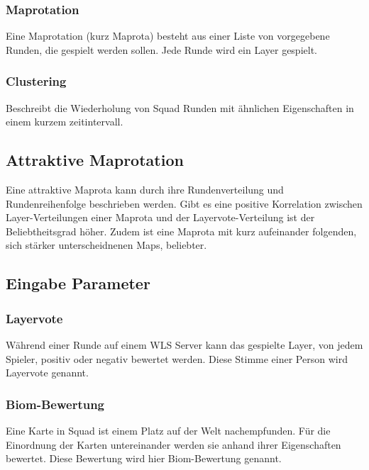 \documentclass[a4paper, 11pt]{scrartcl}
\begin{document}
            \subsubsection{Maprotation}
                Eine Maprotation (kurz Maprota) besteht aus einer Liste von vorgegebene Runden, die gespielt werden sollen.
                Jede Runde wird ein Layer gespielt.
            \subsubsection{Clustering}
                Beschreibt die Wiederholung von Squad Runden mit ähnlichen Eigenschaften in einem kurzem zeitintervall.
            \subsection{Attraktive Maprotation}
                Eine attraktive Maprota kann durch ihre Rundenverteilung und Rundenreihenfolge beschrieben werden.
                Gibt es eine positive Korrelation zwischen Layer-Verteilungen einer Maprota und der Layervote-Verteilung ist der Beliebtheitsgrad höher.
                Zudem ist eine Maprota mit kurz aufeinander folgenden, sich stärker unterscheidnenen Maps, beliebter.
        \subsection{Eingabe Parameter}
            \subsubsection{Layervote}
                Während einer Runde auf einem WLS Server kann das gespielte Layer, von jedem Spieler,
                positiv oder negativ bewertet werden.
                Diese Stimme einer Person wird Layervote genannt.
            \subsubsection{Biom-Bewertung}
                Eine Karte in Squad ist einem Platz auf der Welt nachempfunden. 
                Für die Einordnung der Karten untereinander werden sie anhand ihrer Eigenschaften bewertet.
                Diese Bewertung wird hier Biom-Bewertung genannt.
\end{document}
